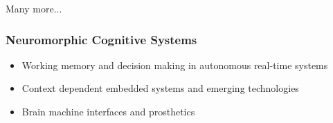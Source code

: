 \documentclass[main]{subfiles}
\begin{document}
Many more...

\subsubsection{Neuromorphic Cognitive Systems}
\begin{itemize}
\item Working memory and decision making in autonomous real-time systems
\item Context dependent embedded systems and emerging technologies
\item Brain machine interfaces and prosthetics
\end{itemize}
\end{document}
